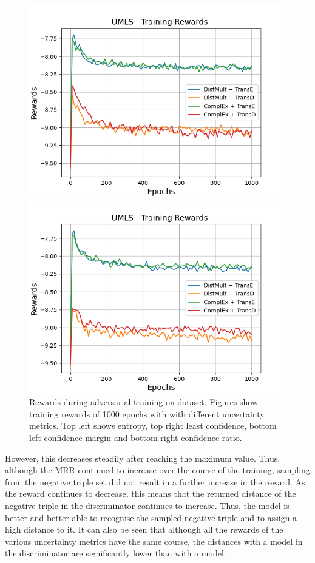 \begin{figure}[H]
\begin{minipage}{.5\textwidth}
      \centering
      \includegraphics[width=0.9\linewidth]{figures/results/gan_train/not_pretrained/uncertainty/max_distribution/confidence_margin/umls/uncertainty_umls_rew.png}
    \end{minipage}%
    \begin{minipage}{.5\textwidth}
      \centering
      \includegraphics[width=0.9\linewidth]{figures/results/gan_train/not_pretrained/uncertainty/max_distribution/confidence_ratio/umls/uncertainty_umls_rew.png}
    \end{minipage}%
    \caption{Rewards during adversarial training on \umls dataset. 
    Figures show training rewards of 1000 epochs with \ussoftmax with different uncertainty metrics.
    Top left shows entropy, top right least confidence, 
    bottom left confidence margin and bottom right confidence ratio.}
    \label{fig:advtrain_metrics_umls_rew}
\end{figure}
However, this decreases steadily after reaching the maximum value.
Thus, although the MRR continued to increase over the course of the training, sampling from the negative triple set did not result in a further increase in the reward.
As the reward continues to decrease, this means that the returned distance of the negative triple in the discriminator continues to increase.
Thus, the model is better and better able to recognise the sampled negative triple and to assign a high distance to it.
It can also be seen that although all the rewards of the various uncertainty metrics have the same course, the distances with a \transd model in the discriminator are significantly lower than with a \transe model.
